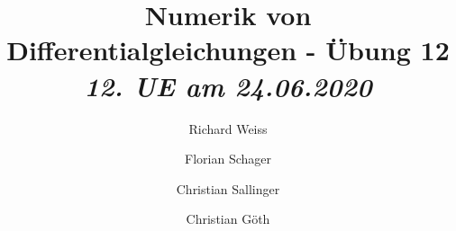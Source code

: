 \documentclass{article}
\title
{
  Numerik von Differentialgleichungen - Übung 12 \\
  \vspace{4pt}
  \normalsize
  \textit{12. UE am 24.06.2020}
}
\author
{
  Richard Weiss       \and
  Florian Schager     \and
  Christian Sallinger \and
  Christian Göth
}
\date{}
\begin{document}
\renewcommand{\figurename}{Abbildung}
\maketitle






\end{document}
